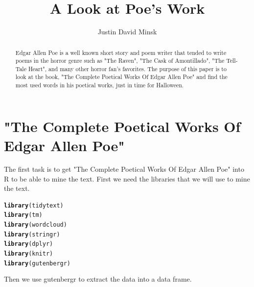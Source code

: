 \documentclass{article}\usepackage[]{graphicx}\usepackage[]{color}
\makeatletter
\newcommand{\hlstd}[1]{\textcolor[rgb]{0.345,0.345,0.345}{#1}}%
\newcommand{\hlkwd}[1]{\textcolor[rgb]{0.737,0.353,0.396}{\textbf{#1}}}%
\newenvironment{kframe}{%
 \def\at@end@of@kframe{}%
 \ifinner\ifhmode%
  \def\at@end@of@kframe{\end{minipage}}%
  \begin{minipage}{\columnwidth}%
 \fi\fi%
 \def\FrameCommand##1{\hskip\@totalleftmargin \hskip-\fboxsep
 \colorbox{shadecolor}{##1}\hskip-\fboxsep
     \hskip-\linewidth \hskip-\@totalleftmargin \hskip\columnwidth}%
 \MakeFramed {\advance\hsize-\width
   \@totalleftmargin\z@ \linewidth\hsize
   \@setminipage}}%
 {\par\unskip\endMakeFramed%
 \at@end@of@kframe}
\newenvironment{knitrout}{}{} %
\makeatother
\begin{document}
\title{A Look at Poe's Work}
\author{Justin David Minsk}
\maketitle



\begin{abstract}
Edgar Allen Poe is a well known short story and poem writer that tended to write poems in the horror genre such as "The Raven", "The Cask of Amontillado", "The Tell-Tale Heart", and many other horror fan's favorites. The purpose of this paper is to look at the book, "The Complete Poetical Works Of Edgar Allen Poe" and find the most used words in his poetical works, just in time for Halloween.
\end{abstract}

\section{"The Complete Poetical Works Of Edgar Allen Poe"}
The first task is to get "The Complete Poetical Works Of Edgar Allen Poe" into R to be able to mine the text. First we need the libraries that we will use to mine the text.

\begin{knitrout}
\color{fgcolor}\begin{kframe}
\begin{alltt}
\hlkwd{library}\hlstd{(tidytext)}
\hlkwd{library}\hlstd{(tm)}
\hlkwd{library}\hlstd{(wordcloud)}
\hlkwd{library}\hlstd{(stringr)}
\hlkwd{library}\hlstd{(dplyr)}
\hlkwd{library}\hlstd{(knitr)}
\hlkwd{library}\hlstd{(gutenbergr)}
\end{alltt}
\end{kframe}
\end{knitrout}

\noindent Then we use gutenbergr to extract the data into a data frame.
\end{document}
